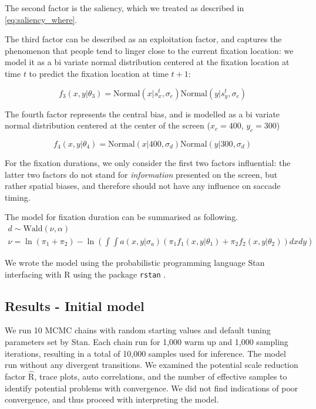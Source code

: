 \documentclass{article}
\begin{document}
The second factor is the saliency, which we treated as described in \ref{eq:saliency_where}.

The third factor can be described as an exploitation factor, and captures the phenomenon that people tend to linger close to the current fixation location: we model it as a bi variate normal distribution centered at the fixation location at time $t$ to predict the fixation location at time $t+1$:

\begin{equation}
    f_3(x, y|\theta_3) = \text{Normal}(x | s_x^t, \sigma_e) \text{Normal}(y | s_y^t, \sigma_e)
\end{equation}

The fourth factor represents the central bias, and is modelled as a bi variate normal distribution centered at the center of the screen ($x_c = 400$, $y_c = 300$)

\begin{equation}
    f_4(x, y|\theta_4) = \text{Normal}(x | 400, \sigma_d) \text{Normal}(y | 300, \sigma_d)
\end{equation}

For the fixation durations, we only consider the first two factors influential: the latter two factors do not stand for \textit{information} presented on the screen, but rather spatial biases, and therefore should not have any influence on saccade timing.

The model for fixation duration can be summarised as following.
\begin{gather*}
    d \sim \text{Wald}(\nu, \alpha) \\
    \nu = \ln(\pi_1 + \pi_2) - \ln\left(\int\int a(x, y | \sigma_a) \left(\pi_1 f_1(x, y | \theta_1) + \pi_2 f_2(x, y | \theta_2)\right)dxdy\right)
\end{gather*}


We wrote the model using the probabilistic programming language Stan \citep{carpenter2017stan} interfacing with R \citep{citeR} using the package \texttt{rstan} \citep{team2020rstan}.

\subsection{Results - Initial model}

We run 10 MCMC chains with random starting values and default tuning parameters set by Stan. Each chain run for 1,000 warm up and 1,000 sampling iterations, resulting in a total of 10,000 samples used for inference.
The model run without any divergent transitions. We examined the potential scale reduction factor $\hat{\text{R}}$, trace plots, auto correlations, and the number of effective samples to identify potential problems with convergence. We did not find indications of poor convergence, and thus proceed with interpreting the model.
\end{document}
